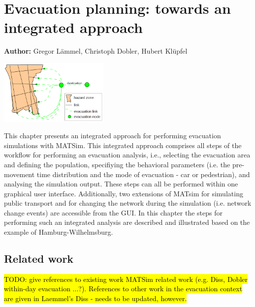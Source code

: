 \chapter{Evacuation planning: towards an integrated approach}
\label{ch:evacuation}

\hfill \textbf{Author:} Gregor L\"ammel, Christoph Dobler, Hubert Kl\"upfel 

\begin{center} \includegraphics[width=0.4\textwidth, angle=0]{extending/figures/Evacuation/evacuation} \end{center}

This chapter presents an integrated approach for performing evacuation simulations with MATSim.
This integrated approach comprises all steps of the workflow for performing an evacuation analysis, i.e., 
selecting the evacuation area and defining the population, specifiying the behavioral parameters 
(i.e. the pre-movement time distribution and the mode of evacuation - car or pedestrian), 
and analysing the simulation output.
These steps can all be performed within one graphical user interface.
Additionally, two extensions of MATsim for simulating public transport and for changing the network 
during the simulation (i.e. network change events) are accessible from the GUI.
In this chapter the steps for performing such an integrated analysis are described and illustrated based on
the example of Hamburg-Wilhelmsburg.

\section{Related work}
\hl{TODO: give references to existing work MATSim related work (e.g.  Diss, Dobler within-day evacuation ...?).
References to other work in the evacuation context are given in Laemmel's Diss - needs to be updated, however.}

